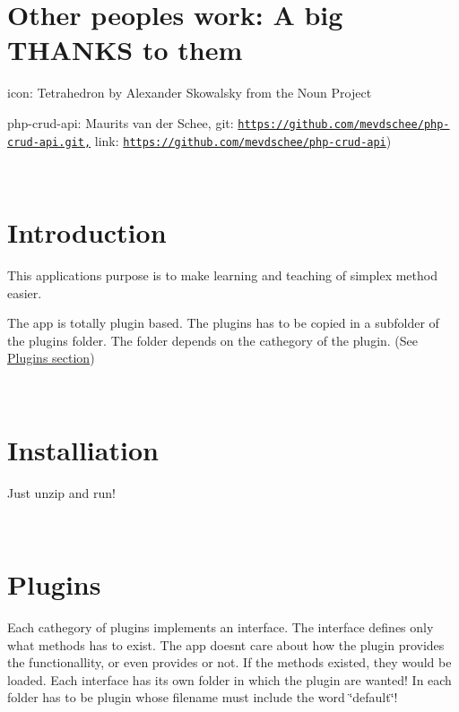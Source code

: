 \hypertarget{index_credit}{}\section{Other peoples work\+: A big T\+H\+A\+N\+K\+S to them}\label{index_credit}
icon\+: Tetrahedron by Alexander Skowalsky from the Noun Project

php-\/crud-\/api\+: Maurits van der Schee, git\+: \href{https://github.com/mevdschee/php-crud-api.git,}{\tt https\+://github.\+com/mevdschee/php-\/crud-\/api.\+git,} link\+: \href{https://github.com/mevdschee/php-crud-api}{\tt https\+://github.\+com/mevdschee/php-\/crud-\/api})

~\newline
~\newline




 

\hypertarget{index_intro_sec}{}\section{Introduction}\label{index_intro_sec}
This applications purpose is to make learning and teaching of simplex method easier.

The app is totally plugin based. The plugins has to be copied in a subfolder of the \textquotesingle{}plugins\textquotesingle{} folder. The folder depends on the cathegory of the plugin. (See \hyperlink{index_plugins_sec}{Plugins section})

~\newline
~\newline




 

 \hypertarget{index_install_sec}{}\section{Installiation}\label{index_install_sec}
Just unzip and run!

~\newline
~\newline




 

\hypertarget{index_plugins_sec}{}\section{Plugins}\label{index_plugins_sec}
Each cathegory of plugins implements an interface. The interface defines only what methods has to exist. The app doesn\textquotesingle{}t care about how the plugin provides the functionallity, or even provides or not. If the methods existed, they would be loaded. Each interface has its own folder in which the plugin are wanted! In each folder has to be plugin whose filename must include the word \char`\"{}default\char`\"{}!

